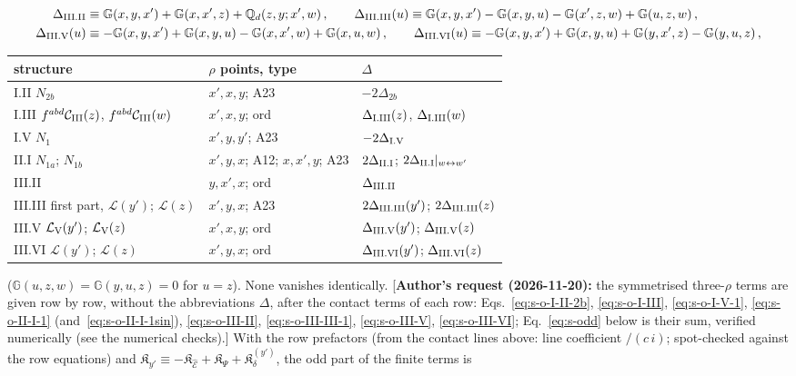 \documentclass[9pt]{article}
\def\mf#1{\mathbb{#1}}
\numberwithin{equation}{section}
\begin{document}
{\begin{align}
\Delta_{\rm III.II}&\equiv\mf{G}(x,y,x')+\mf{G}(x,x',z)+\mf{Q}_{d}(z,y;x',w)\,,\qquad
\Delta_{\rm III.III}(u)\equiv\mf{G}(x,y,x')-\mf{G}(x,y,u)-\mf{G}(x',z,w)+\mf{G}(u,z,w)\,,\notag\\
\Delta_{\rm III.V}(u)&\equiv-\mf{G}(x,y,x')+\mf{G}(x,y,u)-\mf{G}(x,x',w)+\mf{G}(x,u,w)\,,\qquad
\Delta_{\rm III.VI}(u)\equiv-\mf{G}(x,y,x')+\mf{G}(x,y,u)+\mf{G}(y,x',z)-\mf{G}(y,u,z)\,,\label{eq:s-Deltas}
\end{align}
\begin{center}\small\renewcommand{\arraystretch}{1.25}
\begin{tabular}{|l|l|l|}\hline
structure & $\rho$ points, type & $\Delta$\\\hline
I.II $N_{2b}$ & $x',x,y$; A23 & $-2\Delta_{2b}$\\
I.III $f^{abd}\mathcal{C}_{\rm III}(z)$, $f^{abd}\mathcal{C}_{\rm III}(w)$ & $x',x,y$; ord & $\Delta_{\rm I.III}(z)$, $\Delta_{\rm I.III}(w)$\\
I.V $N_{1}$ & $x',y,y'$; A23 & $-2\Delta_{\rm I.V}$\\
II.I $N_{1a}$; $N_{1b}$ & $x',y,x$; A12; $x,x',y$; A23 & $2\Delta_{\rm II.I}$; $2\Delta_{\rm II.I}|_{w\leftrightarrow w'}$\\
III.II & $y,x',x$; ord & $\Delta_{\rm III.II}$\\
III.III first part, $\mathcal{L}(y')$; $\mathcal{L}(z)$ & $x',y,x$; A23 & $2\Delta_{\rm III.III}(y')$; $2\Delta_{\rm III.III}(z)$\\
III.V $\mathcal{L}_{\rm V}(y')$; $\mathcal{L}_{\rm V}(z)$ & $x',x,y$; ord & $\Delta_{\rm III.V}(y')$; $\Delta_{\rm III.V}(z)$\\
III.VI $\mathcal{L}(y')$; $\mathcal{L}(z)$ & $x',y,x$; ord & $\Delta_{\rm III.VI}(y')$; $\Delta_{\rm III.VI}(z)$\\\hline
\end{tabular}\end{center}
($\mf{G}(u,z,w)=\mf{G}(y,u,z)=0$ for $u=z$). None vanishes identically. [\textbf{Author's request (2026-11-20):} the symmetrised three-$\rho$ terms are given row by row, without the abbreviations $\Delta$, after the contact terms of each row: Eqs.~\eqref{eq:s-o-I-II-2b}, \eqref{eq:s-o-I-III}, \eqref{eq:s-o-I-V-1}, \eqref{eq:s-o-II-I-1} (and~\eqref{eq:s-o-II-I-1sin}), \eqref{eq:s-o-III-II}, \eqref{eq:s-o-III-III-1}, \eqref{eq:s-o-III-V}, \eqref{eq:s-o-III-VI}; Eq.~\eqref{eq:s-odd} below is their sum, verified numerically (see the numerical checks).] With the row prefactors (from the contact lines above: line coefficient $/(c\,i)$; spot-checked against the row equations) and $\mathfrak{K}_{y'}\equiv-\mathfrak{K}_{\widehat{\mathcal{E}}}+\mathfrak{K}_{\Psi}+\mathfrak{K}^{(y')}_{\delta}$, the odd part of the finite terms is
}
\end{document}
